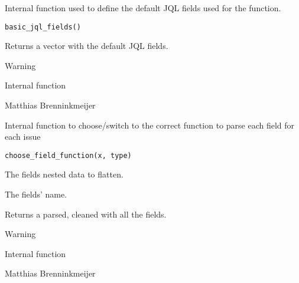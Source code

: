 \documentclass[a4paper]{book}
\begin{document}
%
\begin{Description}\relax
Internal function used to define the default JQL fields used for the  function.
\end{Description}
%
\begin{Usage}
\begin{verbatim}
basic_jql_fields()
\end{verbatim}
\end{Usage}
%
\begin{Value}
Returns a  vector with the default JQL fields.
\end{Value}
%
\begin{Section}{Warning}

Internal function
\end{Section}
%
\begin{Author}\relax
Matthias Brenninkmeijer 
\end{Author}
%
\begin{Description}\relax
Internal function to choose/switch to the correct function to parse each field for each issue
\end{Description}
%
\begin{Usage}
\begin{verbatim}
choose_field_function(x, type)
\end{verbatim}
\end{Usage}
%
\begin{Arguments}
\begin{ldescription}
\item[\code{x}] The fields nested data to flatten.

\item[\code{type}] The fields' name.
\end{ldescription}
\end{Arguments}
%
\begin{Value}
Returns a parsed, cleaned  with all the fields.
\end{Value}
%
\begin{Section}{Warning}

Internal function
\end{Section}
%
\begin{Author}\relax
Matthias Brenninkmeijer 
\end{Author}
\end{document}
